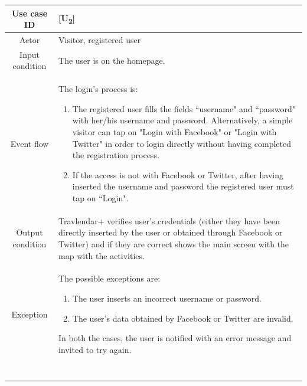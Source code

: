 \documentclass[12pt,titlepage]{article}
\begin{document}
\begin{tabular}{cp{10cm}} 
Use case ID& {[U\textsubscript{2}]}\\ \hline
Actor&Visitor, registered user\\ \hline 

Input condition&The user is on the homepage.\\ \hline
Event flow&The login's process is:\begin{enumerate}
\item The registered user fills the fields ``username" and ``password" with her/his username and password. Alternatively, a simple visitor can tap on "Login with Facebook" or "Login with Twitter" in order to login directly without having completed the registration process.   
\item If the access is not with Facebook or Twitter, after having inserted the username and password the registered user must tap on ``Login".

\end{enumerate} \\ \hline
Output condition& Travlendar+ verifies user's credentials (either they have been directly inserted by the user or obtained through Facebook or Twitter) and if they are correct shows the main screen with the map with the activities.
\\ \hline
Exception& The possible exceptions are:
\begin{enumerate}
\item The user inserts an incorrect username or password.
\item The user's data obtained by Facebook or Twitter are invalid.
\end{enumerate} 
In both the cases, the user is notified with an error message and invited to try again.\\ \hline \

\end{tabular}
\end{document}
